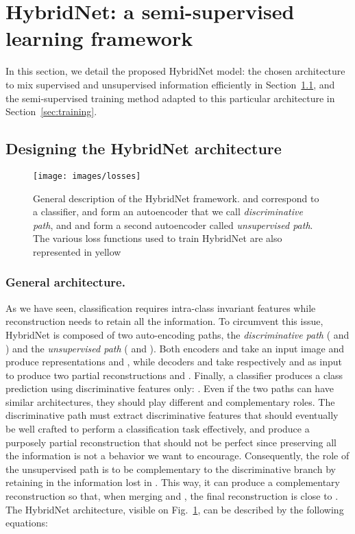 \documentclass[runningheads]{llncs}
\begin{document}
\section{HybridNet: a semi-supervised learning framework}
\label{sec:architecture}

In this section, we detail the proposed HybridNet model: the chosen architecture to mix supervised and unsupervised information efficiently in Section~\ref{sec:archi}, and the semi-supervised training method adapted to this particular architecture in Section~\ref{sec:training}.

\subsection{Designing the HybridNet architecture}
\label{sec:archi}

\begin{figure}[tb]
	\centering
	\texttt{[image: images/losses]}
    \caption{General description of the HybridNet framework.  and  correspond to a classifier,  and  form an autoencoder that we call \textit{discriminative path}, and  and  form a second autoencoder called \textit{unsupervised path}. The various loss functions used to train HybridNet are also represented in yellow}
    \label{fig:general-archi}
\end{figure}

\subsubsection{General architecture.}
As we have seen, classification requires intra-class invariant features while reconstruction needs to retain all the information. To circumvent this issue, HybridNet is composed of two auto-encoding paths, the \textit{discriminative path} ( and ) and the \textit{unsupervised path} ( and ). Both encoders  and  take an input image  and produce representations  and , while decoders  and  take respectively  and  as input to produce two partial reconstructions  and . Finally, a classifier  produces a class prediction using discriminative features only: . Even if the two paths can have similar architectures, they should play different and complementary roles. The discriminative path must extract discriminative features  that should eventually be well crafted to perform a classification task effectively, and produce a purposely partial reconstruction  that should not be perfect since preserving all the information is not a behavior we want to encourage. Consequently, the role of the unsupervised path is to be complementary to the discriminative branch by retaining in  the information lost in . This way, it can produce a complementary reconstruction  so that, when merging  and , the final reconstruction  is close to . The HybridNet architecture, visible on Fig.~\ref{fig:general-archi}, can be described by the following equations:
\end{document}
